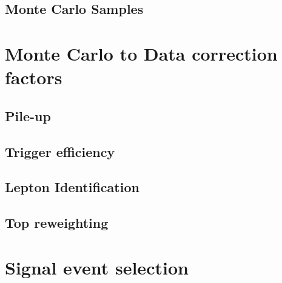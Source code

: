 \subsection{Monte Carlo Samples}


\section{Monte Carlo to Data correction factors}

\subsection{Pile-up}

\subsection{Trigger efficiency}

\subsection{Lepton Identification}

\subsection{Top reweighting}

\section{Signal event selection}

